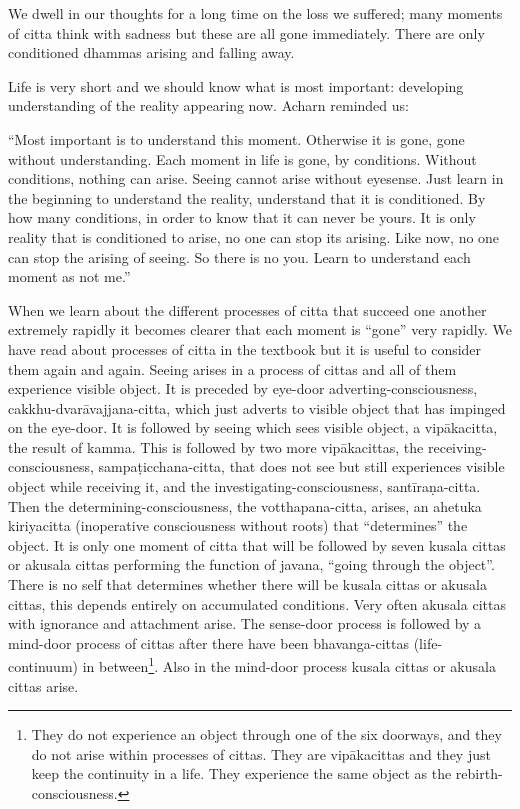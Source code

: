 We dwell in our thoughts for a long time on the loss we suffered; many
moments of citta think with sadness but these are all gone immediately.
There are only conditioned dhammas arising and falling away.

Life is very short and we should know what is most important: developing
understanding of the reality appearing now. Acharn reminded us:

``Most important is to understand this moment. Otherwise it is gone,
gone without understanding. Each moment in life is gone, by conditions.
Without conditions, nothing can arise. Seeing cannot arise without
eyesense. Just learn in the beginning to understand the reality,
understand that it is conditioned. By how many conditions, in order to
know that it can never be yours. It is only reality that is conditioned
to arise, no one can stop its arising. Like now, no one can stop the
arising of seeing. So there is no you. Learn to understand each moment
as not me.''

When we learn about the different processes of citta that succeed one
another extremely rapidly it becomes clearer that each moment is
``gone'' very rapidly. We have read about processes of citta in the
textbook but it is useful to consider them again and again. Seeing
arises in a process of cittas and all of them experience visible object.
It is preceded by eye-door adverting-consciousness,
cakkhu-dvarāvajjana-citta, which just adverts to visible object that has
impinged on the eye-door. It is followed by seeing which sees visible
object, a vipākacitta, the result of kamma. This is followed by two more
vipākacittas, the receiving-consciousness, sampaṭicchana-citta, that
does not see but still experiences visible object while receiving it,
and the investigating-consciousness, santīraṇa-citta. Then the
determining-consciousness, the votthapana-citta, arises, an ahetuka
kiriyacitta (inoperative consciousness without roots) that
``determines'' the object. It is only one moment of citta that will be
followed by seven kusala cittas or akusala cittas performing the
function of javana, ``going through the object''. There is no self that
determines whether there will be kusala cittas or akusala cittas, this
depends entirely on accumulated conditions. Very often akusala cittas
with ignorance and attachment arise. The sense-door process is followed
by a mind-door process of cittas after there have been bhavanga-cittas
(life-continuum) in
between\footnote{They do not experience
an object through one of the six doorways, and they do not arise within
processes of cittas. They are vipākacittas and they just keep the
continuity in a life. They experience the same object as the
rebirth-consciousness.}. Also in the
mind-door process kusala cittas or akusala cittas arise.

